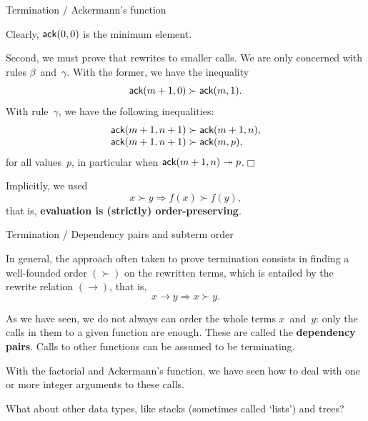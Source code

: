 %
\begin{frame}{Termination / Ackermann's function}

  Clearly, \(\textsf{ack}(0,0)\) is the minimum element.

  \bigskip

  Second, we must prove that  rewrites to smaller calls. We
  are only concerned with rules \(\beta\)~and~\(\gamma\). With the
  former, we have the inequality
  \begin{equation*}
    \textsf{ack}(m+1,0) \succ \textsf{ack}(m,1).
  \end{equation*}
  With rule~\(\gamma\), we have the following inequalities:
  \begin{equation*}
    \begin{array}{@{}r@{\;}l@{\;}l@{}}
      \fun{ack}(m+1,n+1) & \succ & \fun{ack}(m+1,n),\\
      \fun{ack}(m+1,n+1) & \succ & \fun{ack}(m,p),
    \end{array}
  \end{equation*}
  for all values~\(p\), in particular when \(\textsf{ack}(m+1,n)
  \twoheadrightarrow p\).\hfill\(\Box\)

  \bigskip

  Implicitly, we used \[x \succ y \Rightarrow f(x) \succ f(y),\]
  that is, \textbf{evaluation is (strictly) order\hyp{}preserving}.

\end{frame}

%
\begin{frame}{Termination / Dependency pairs and subterm order}

  In general, the approach often taken to prove termination consists
  in finding a well\hyp{}founded order \((\succ)\) on the rewritten
  terms, which is entailed by the rewrite relation \((\rightarrow)\),
  that is,
  \begin{equation*}
    x \rightarrow y  \Rightarrow  x \succ y.
  \end{equation*}

  \medskip

  As we have seen, we do not always can order the whole terms
  \(x\)~and~\(y\): only the calls in them to a given function are
  enough. These are called the \textbf{dependency pairs}. Calls to
  other functions can be assumed to be terminating.

  \bigskip

  With the factorial and Ackermann's function, we have seen how to
  deal with one or more integer arguments to these calls.

  \bigskip

  What about other data types, like stacks (sometimes called `lists')
  and trees?

\end{frame}

